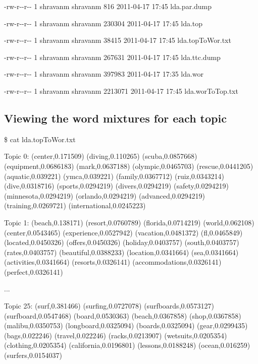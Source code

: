 {\ttfamily -\/rw-\/r-\/-\/r-\/-\/ 1 shravanm shravanm 816 2011-\/04-\/17 17:45 lda.par.dump  }

{\ttfamily -\/rw-\/r-\/-\/r-\/-\/ 1 shravanm shravanm 230304 2011-\/04-\/17 17:45 lda.top  }

{\ttfamily -\/rw-\/r-\/-\/r-\/-\/ 1 shravanm shravanm 38415 2011-\/04-\/17 17:45 lda.topToWor.txt  }

{\ttfamily -\/rw-\/r-\/-\/r-\/-\/ 1 shravanm shravanm 267631 2011-\/04-\/17 17:45 lda.ttc.dump  }

{\ttfamily -\/rw-\/r-\/-\/r-\/-\/ 1 shravanm shravanm 397983 2011-\/04-\/17 17:35 lda.wor  }

{\ttfamily -\/rw-\/r-\/-\/r-\/-\/ 1 shravanm shravanm 2213071 2011-\/04-\/17 17:45 lda.worToTop.txt  } \hypertarget{single__machine__usage_word_mix}{}\subsection{Viewing the word mixtures for each topic}\label{single__machine__usage_word_mix}
{\ttfamily  }

{\ttfamily \$ cat lda.topToWor.txt }

{\ttfamily Topic 0: (center,0.171509) (diving,0.110265) (scuba,0.0857668) (equipment,0.0686183) (mark,0.0637188) (olympic,0.0465703) (rescue,0.0441205) (aquatic,0.039221) (ymca,0.039221) (family,0.0367712) (ruiz,0.0343214) (dive,0.0318716) (sports,0.0294219) (divers,0.0294219) (safety,0.0294219) (minnesota,0.0294219) (orlando,0.0294219) (advanced,0.0294219) (training,0.0269721) (international,0.0245223)  }

{\ttfamily Topic 1: (beach,0.138171) (resort,0.0760789) (florida,0.0714219) (world,0.062108) (center,0.0543465) (experience,0.0527942) (vacation,0.0481372) (fl,0.0465849) (located,0.0450326) (offers,0.0450326) (holiday,0.0403757) (south,0.0403757) (rates,0.0403757) (beautiful,0.0388233) (location,0.0341664) (sea,0.0341664) (activities,0.0341664) (resorts,0.0326141) (accommodations,0.0326141) (perfect,0.0326141)  }

{\ttfamily ... }

{\ttfamily Topic 25: (surf,0.381466) (surfing,0.0727078) (surfboards,0.0573127) (surfboard,0.0547468) (board,0.0530363) (beach,0.0367858) (shop,0.0367858) (malibu,0.0350753) (longboard,0.0325094) (boards,0.0325094) (gear,0.0299435) (bags,0.022246) (travel,0.022246) (racks,0.0213907) (wetsuits,0.0205354) (clothing,0.0205354) (california,0.0196801) (lessons,0.0188248) (ocean,0.016259) (surfers,0.0154037)  }

